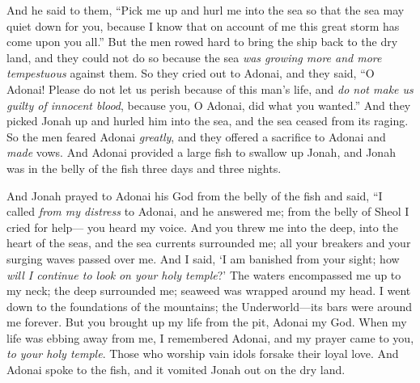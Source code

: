 \begin{biblechapter}
\verse And he said to them, “Pick me up and hurl me into the sea so that the sea may quiet down for you, because I know that on account of me this great storm has come upon you all.”
\verse But the men rowed hard to bring the ship back to the dry land, and they could not do so because the sea \textit{was growing more and more tempestuous} against them.
\verse So they cried out to Adonai, and they said, “O Adonai! Please do not let us perish because of this man’s life, and \textit{do not make us guilty of innocent blood}, because you, O Adonai, did what you wanted.”
\verse And they picked Jonah up and hurled him into the sea, and the sea ceased from its raging.
\verse So the men feared Adonai \textit{greatly}, and they offered a sacrifice to Adonai and \textit{made} vows.
  And Adonai provided a large fish to swallow up Jonah, and Jonah was in the belly of the fish three days and three nights.
\end{biblechapter}

\begin{biblechapter} %
\verse And Jonah prayed to Adonai his God from the belly of the fish
\verse and said,
\verse “I called \textit{from my distress} to Adonai, 
and he answered me; 
from the belly of Sheol I cried for help— 
you heard my voice.
\verse And you threw me into the deep, 
into the heart of the seas, 
and the sea currents surrounded me; 
all your breakers and your surging waves 
passed over me.
\verse And I said, ‘I am banished 
from your sight; 
how \textit{will I continue to look} 
\textit{on your holy temple}?’
\verse The waters encompassed me up to my neck; 
the deep surrounded me; 
seaweed was wrapped around my head.
\verse I went down to the foundations of the mountains; 
the Underworld—its bars were around me forever. 
But you brought up my life from the pit, 
Adonai my God.
\verse When my life was ebbing away from me, 
I remembered Adonai, 
and my prayer came to you, 
\textit{to your holy temple}.
\verse Those who worship vain idols 
forsake their loyal love.
\verse And Adonai spoke to the fish, and it vomited Jonah out on the dry land.
\end{biblechapter}

